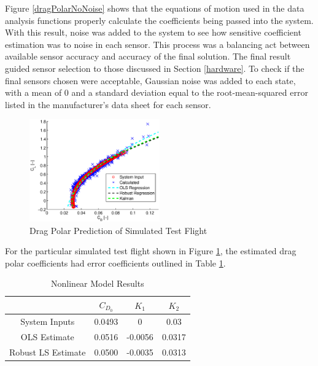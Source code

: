 \documentclass[]{aiaa-tc}%
\begin{document}
Figure \ref{dragPolarNoNoise} shows that the equations of motion used in the data analysis functions properly calculate the coefficients being passed into the system. With this result, noise was added to the system to see how sensitive coefficient estimation was to noise in each sensor. This process was a balancing act between available sensor accuracy and accuracy of the final solution. The final result guided sensor selection to those discussed in Section \ref{hardware}. To check if the final sensors chosen were acceptable, Gaussian noise was added to each state, with a mean of $0$ and a standard deviation equal to the root-mean-squared error listed in the manufacturer's data sheet for each sensor.
\begin{figure}[H]
  \caption{Drag Polar Prediction of Simulated Test Flight} \label{dragPolarNoise}
  \centering
    \includegraphics[width=0.5\textwidth]{figures/simDragPolarNoise.eps}
\end{figure}

For the particular simulated test flight shown in Figure \ref{dragPolarNoise}, the estimated drag polar coefficients had error coefficients outlined in Table \ref{simCoeffErrorTable}.

\begin{table}[H]
\caption{Nonlinear Model Results} %
\centering %
\begin{tabular}{c c c c} %
\hline\hline %
 & $C_{D_0}$ & $K_1$ & $K_2$ \\ [0.5ex] %
\hline %
System Inputs & 0.0493 & 0 & 0.03 \\ %
OLS Estimate & 0.0516 & -0.0056 & 0.0317 \\
Robust LS Estimate & 0.0500 & -0.0035 & 0.0313 \\ [1ex] %
\hline %
\end{tabular}
\label{simCoeffErrorTable} %
\end{table}
\end{document}
